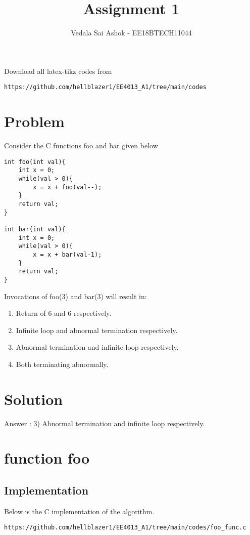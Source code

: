 \documentclass[journal,12pt,twocolumn]{IEEEtran}
\begin{document}
     \def\rightbox#1{\makebox[0in][r]{#1}}
     \def\centbox#1{\makebox[0in]{#1}}
     \def\topbox#1{\raisebox{-\baselineskip}[0in][0in]{#1}}
     \def\midbox#1{\raisebox{-0.5\baselineskip}[0in][0in]{#1}}
\vspace{3cm}
\title{Assignment 1}
\author{Vedala Sai Ashok - EE18BTECH11044}
\maketitle
\newpage
\bigskip
\renewcommand{\thefigure}{\theenumi}
\renewcommand{\thetable}{\theenumi}
Download all latex-tikz codes from 
%
\begin{lstlisting}
https://github.com/hellblazer1/EE4013_A1/tree/main/codes
\end{lstlisting}
\setcounter{figure}{0}
\section{Problem}
Consider the C functions foo and bar given below
\begin{lstlisting}
int foo(int val){
    int x = 0;
    while(val > 0){
        x = x + foo(val--);
    }
    return val;
}

int bar(int val){
    int x = 0;
    while(val > 0){
        x = x + bar(val-1);
    }
    return val;
}
\end{lstlisting}
\setcounter{figure}{0}
Invocations of foo(3) and bar(3) will result in:
\begin{enumerate}
    \item Return of 6 and 6 respectively.
    \item Infinite loop and abnormal termination respectively.
    \item Abnormal termination and infinite loop respectively.
    \item Both terminating abnormally.
\end{enumerate}
\section{Solution}
Answer : 3) Abnormal termination and infinite loop respectively.

\section{function foo}

\subsection{Implementation}
Below is the C implementation of the algorithm.
\begin{lstlisting}
https://github.com/hellblazer1/EE4013_A1/tree/main/codes/foo_func.c
\end{lstlisting}
\end{document}

